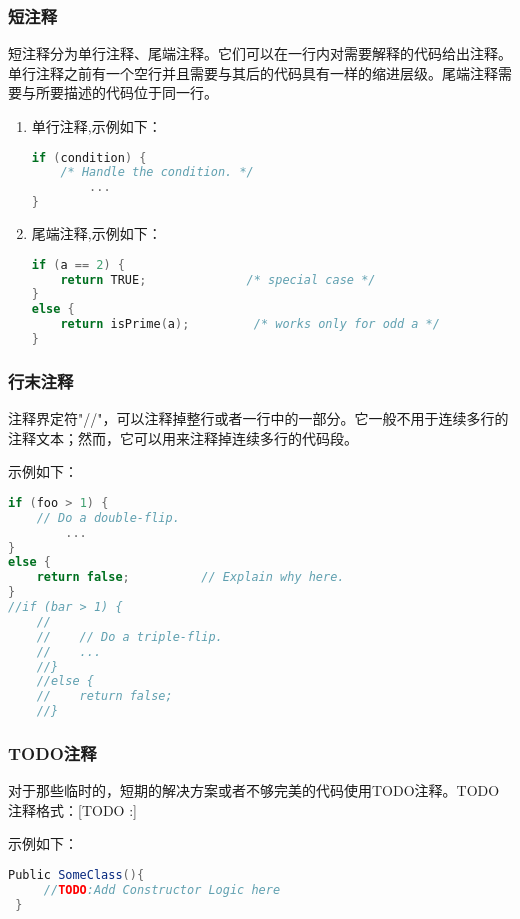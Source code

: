 \subsubsection{短注释}

短注释分为单行注释、尾端注释。它们可以在一行内对需要解释的代码给出注释。单行注释之前有一个空行并且需要与其后的代码具有一样的缩进层级。尾端注释需要与所要描述的代码位于同一行。

\begin{enumerate}
\item 单行注释,示例如下：

\begin{lstlisting}[language=c]
if (condition) {                      
    /* Handle the condition. */
 		...
}
\end{lstlisting}

\item 尾端注释,示例如下：

\begin{lstlisting}[language=c]
if (a == 2) {
    return TRUE;              /* special case */
} 
else {
    return isPrime(a);         /* works only for odd a */
}
\end{lstlisting}
\end{enumerate}

\subsubsection{行末注释}

注释界定符"//"，可以注释掉整行或者一行中的一部分。它一般不用于连续多行的注释文本；然而，它可以用来注释掉连续多行的代码段。

示例如下：

\begin{lstlisting}[language=c]
if (foo > 1) {
    // Do a double-flip.
      	...
}
else {
    return false;          // Explain why here.
}
//if (bar > 1) {
  	//
  	//    // Do a triple-flip.
  	//    ...
  	//}
  	//else {
  	//    return false;
  	//}
\end{lstlisting}

\subsubsection{TODO注释}

对于那些临时的，短期的解决方案或者不够完美的代码使用TODO注释。TODO注释格式：[TODO :]

示例如下：

\begin{lstlisting}[language=java]
 Public SomeClass(){  
	 //TODO:Add Constructor Logic here
 }
\end{lstlisting}

